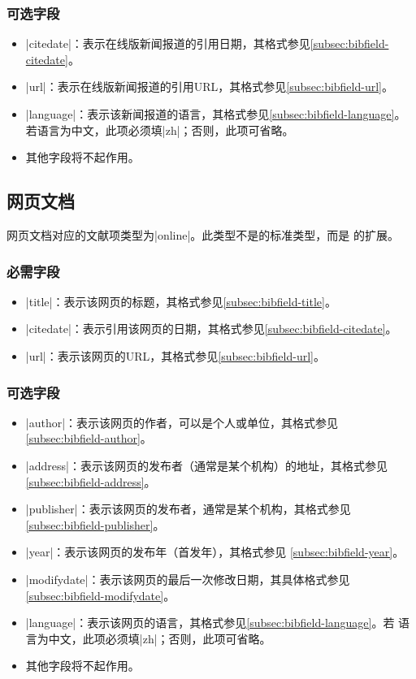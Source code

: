 \subsubsection{可选字段}

\begin{itemize}
\item |citedate|：表示在线版新闻报道的引用日期，其格式参见\ref{subsec:bibfield-citedate}。
\item |url|：表示在线版新闻报道的引用URL，其格式参见\ref{subsec:bibfield-url}。
\item |language|：表示该新闻报道的语言，其格式参见\ref{subsec:bibfield-language}。
  若语言为中文，此项必须填|zh|；否则，此项可省略。
\item 其他字段将不起作用。
\end{itemize}

\subsection{网页文档}\label{subsec:bibtype-webpage}

网页文档对应的{\BibTeX}文献项类型为|online|。此类型不是{\BibTeX}的标准类型，而是
{\njuthesis}的扩展。

\subsubsection{必需字段}

\begin{itemize}
\item |title|：表示该网页的标题，其格式参见\ref{subsec:bibfield-title}。
\item |citedate|：表示引用该网页的日期，其格式参见\ref{subsec:bibfield-citedate}。
\item |url|：表示该网页的URL，其格式参见\ref{subsec:bibfield-url}。
\end{itemize}

\subsubsection{可选字段}

\begin{itemize}
\item |author|：表示该网页的作者，可以是个人或单位，其格式参见
  \ref{subsec:bibfield-author}。
\item |address|：表示该网页的发布者（通常是某个机构）的地址，其格式参见
  \ref{subsec:bibfield-address}。
\item |publisher|：表示该网页的发布者，通常是某个机构，其格式参见
  \ref{subsec:bibfield-publisher}。
\item |year|：表示该网页的发布年（首发年），其格式参见
  \ref{subsec:bibfield-year}。
\item |modifydate|：表示该网页的最后一次修改日期，其具体格式参见
  \ref{subsec:bibfield-modifydate}。
\item |language|：表示该网页的语言，其格式参见\ref{subsec:bibfield-language}。若
  语言为中文，此项必须填|zh|；否则，此项可省略。
\item 其他字段将不起作用。
\end{itemize}

